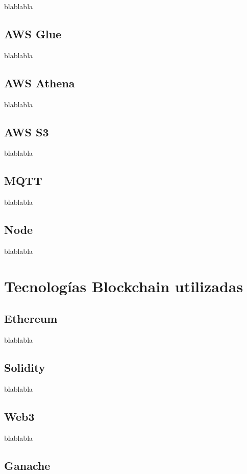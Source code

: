 blablabla



\subsection{AWS Glue}

blablabla

\subsection{AWS Athena}

blablabla



\subsection{AWS S3}

blablabla


\subsection{MQTT}

blablabla


\subsection{Node}

blablabla

\section{Tecnologías Blockchain utilizadas}


\subsection{Ethereum}

blablabla

\subsection{Solidity}

blablabla


\subsection{Web3}

blablabla


\subsection{Ganache}

